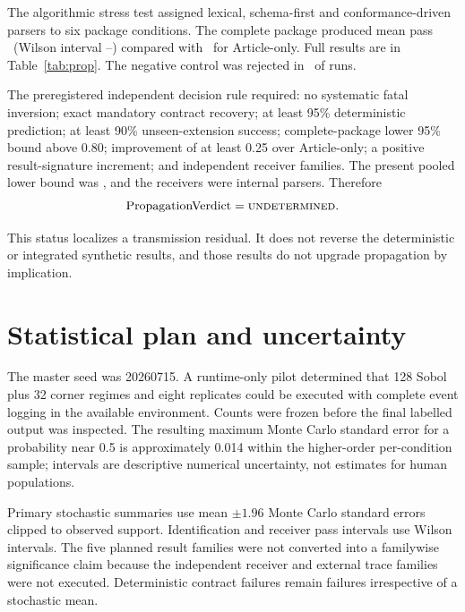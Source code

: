 \documentclass[10pt]{article}
\newcommand{\Und}{\textsc{undetermined}}
\begin{document}
The algorithmic stress test assigned lexical, schema-first and conformance-driven parsers to six package conditions. The complete package produced mean pass \CompletePass\ (Wilson interval \CompletePassLo--\CompletePassHi) compared with \ArticlePass\ for Article-only. Full results are in Table~\ref{tab:prop}. The negative control was rejected in \NegReject\ of runs.

The preregistered independent decision rule required: no systematic fatal inversion; exact mandatory contract recovery; at least 95\% deterministic prediction; at least 90\% unseen-extension success; complete-package lower 95\% bound above 0.80; improvement of at least 0.25 over Article-only; a positive result-signature increment; and independent receiver families. The present pooled lower bound was \CompletePassLo, and the receivers were internal parsers. Therefore
\begin{equation}
\operatorname{PropagationVerdict}=\Und.
\end{equation}

This status localizes a transmission residual. It does not reverse the deterministic or integrated synthetic results, and those results do not upgrade propagation by implication.

\section{Statistical plan and uncertainty}
The master seed was 20260715. A runtime-only pilot determined that 128 Sobol plus 32 corner regimes and eight replicates could be executed with complete event logging in the available environment. Counts were frozen before the final labelled output was inspected. The resulting maximum Monte Carlo standard error for a probability near 0.5 is approximately 0.014 within the higher-order per-condition sample; intervals are descriptive numerical uncertainty, not estimates for human populations.

Primary stochastic summaries use mean $\pm1.96$ Monte Carlo standard errors clipped to observed support. Identification and receiver pass intervals use Wilson intervals\citep{wilson1927}. The five planned result families were not converted into a familywise significance claim because the independent receiver and external trace families were not executed. Deterministic contract failures remain failures irrespective of a stochastic mean.
\end{document}
